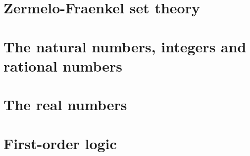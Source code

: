 \documentclass[10pt, a4paper]{report}
\theoremstyle{definition}
\begin{document}
\tableofcontents
\newpage


\chapter{Zermelo-Fraenkel set theory}\label{chap:zermelo_fraenkel_set_theory}

\newpage

\chapter{The natural numbers, integers and rational numbers}\label{chap:the_natural_numbers_integers_and_rational_numbers}

\newpage

\chapter{The real numbers}\label{chap:the_real_numbers}

\newpage

\printbibliography[title={Bibliography}]

\appendix

\chapter{First-order logic}\label{app:first_order_logic}

\end{document}
